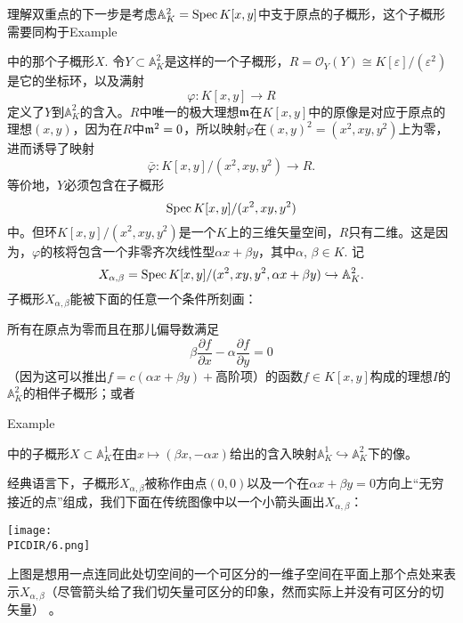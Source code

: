 \begin{exa}[双重点]
理解双重点的下一步是考虑$\mathbb{A}_K^2=\operatorname{Spec} K[x,y]$中支于原点的子概形，这个子概形需要同构于Example {{\addtocounter{thm}{-1}}\thethm{\addtocounter{thm}{1}}}中的那个子概形$X$. 令$Y\subset \mathbb{A}_K^2$是这样的一个子概形，$R=\mathscr{O}_Y(Y)\cong K[\varepsilon]/(\varepsilon^2)$是它的坐标环，以及满射
\[
	\varphi:K[x,y]\to R
\]
定义了$Y$到$\mathbb{A}_K^2$的含入。$R$中唯一的极大理想$\mathfrak{m}$在$K[x,y]$中的原像是对应于原点的理想$(x,y)$，因为在$R$中$\mathfrak{m}^2=0$，所以映射$\varphi$在$(x,y)^2=(x^2,xy,y^2)$上为零，进而诱导了映射
\[
	\bar\varphi:K[x,y]/(x^2,xy,y^2)\to R.
\]
等价地，$Y$必须包含在子概形
\[
	\operatorname{Spec} K[x,y]/(x^2,xy,y^2)
\]
中。但环$K[x,y]/(x^2,xy,y^2)$是一个$K$上的三维矢量空间，$R$只有二维。这是因为，$\varphi$的核将包含一个非零齐次线性型$\alpha x+\beta y$，其中$\alpha$, $\beta\in K$. 记
\[
	X_{\alpha,\beta}=\operatorname{Spec} K[x,y]/(x^2,xy,y^2,\alpha x+\beta y)\hookrightarrow \mathbb{A}_K^2.
\]
子概形$X_{\alpha,\beta}$能被下面的任意一个条件所刻画：

\begin{compactenum}[(i)]
\item 所有在原点为零而且在那儿偏导数满足
\[
	\beta\frac{\partial f}{\partial x}-\alpha\frac{\partial f}{\partial y}=0
\]
（因为这可以推出$f=c(\alpha x+\beta y)+\text{高阶项}$）的函数$f\in K[x,y]$构成的理想$I$的$\mathbb{A}^2_K$的相伴子概形；或者

\item Example {{\addtocounter{thm}{-1}}\thethm{\addtocounter{thm}{1}}}中的子概形$X\subset \mathbb{A}_K^1$在由$x\mapsto (\beta x,-\alpha x)$给出的含入映射$\mathbb{A}_K^1\hookrightarrow\mathbb{A}_K^2$下的像。
\end{compactenum}

经典语言下，子概形$X_{\alpha,\beta}$被称作由点$(0,0)$以及一个在$\alpha x+\beta y=0$方向上“无穷接近的点”组成，我们下面在传统图像中以一个小箭头画出$X_{\alpha,\beta}$：
\begin{center}\texttt{[image: \\PICDIR/6.png]}\end{center}
上图是想用一点连同此处切空间的一个可区分的一维子空间在平面上那个点处来表示$X_{\alpha,\beta}$（尽管箭头给了我们切矢量可区分的印象，然而实际上并没有可区分的切矢量）%
。
\end{exa}


